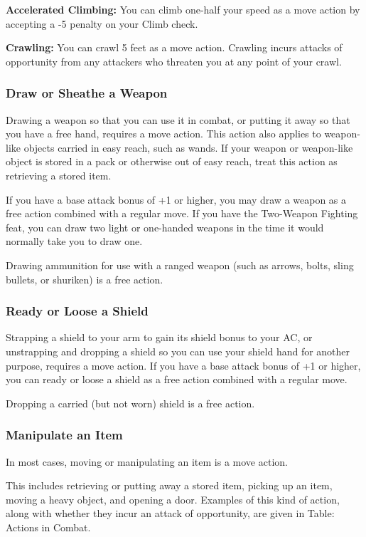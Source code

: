 \textbf{Accelerated Climbing:} You can climb one-half your speed as a move action 
by accepting a -5 penalty on your Climb check.

\textbf{Crawling:} You can crawl 5 feet as a move action. Crawling incurs attacks 
of opportunity from any attackers who threaten you at any point of your crawl.

\subsubsection{Draw or Sheathe a Weapon}

Drawing a weapon so that you can use it in combat, or putting it away so that you 
have a free hand, requires a move action. This action also applies to weapon-like 
objects carried in easy reach, such as wands. If your weapon or weapon-like object 
is stored in a pack or otherwise out of easy reach, treat this action as retrieving 
a stored item.

If you have a base attack bonus of +1 or higher, you may draw a weapon as a free 
action combined with a regular move. If you have the Two-Weapon Fighting feat, 
you can draw two light or one-handed weapons in the time it would normally take 
you to draw one.

Drawing ammunition for use with a ranged weapon (such as arrows, bolts, sling bullets, 
or shuriken) is a free action.

\subsubsection{Ready or Loose a Shield}

Strapping a shield to your arm to gain its shield bonus to your AC, or unstrapping 
and dropping a shield so you can use your shield hand for another purpose, requires 
a move action. If you have a base attack bonus of +1 or higher, you can ready or 
loose a shield as a free action combined with a regular move.

Dropping a carried (but not worn) shield is a free action.

\subsubsection{Manipulate an Item}

In most cases, moving or manipulating an item is a move action.

This includes retrieving or putting away a stored item, picking up an item, moving 
a heavy object, and opening a door. Examples of this kind of action, along with 
whether they incur an attack of opportunity, are given in Table: Actions in Combat.

